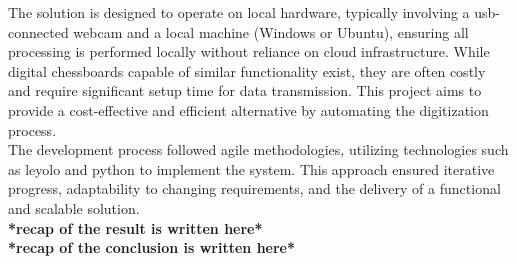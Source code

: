 The solution is designed to operate on local hardware, typically involving a \acrshort{usb}-connected webcam and a local machine (Windows or Ubuntu), ensuring all processing is performed locally without reliance on cloud infrastructure. While digital chessboards capable of similar functionality exist, they are often costly and require significant setup time for data transmission. This project aims to provide a cost-effective and efficient alternative by automating the digitization process.\\

The development process followed \gls{agile} methodologies, utilizing technologies such as \acrshort{leyolo} and \gls{python} to implement the system. This approach ensured iterative progress, adaptability to changing requirements, and the delivery of a functional and scalable solution.\\

\textbf{*recap of the result is written here*}\\

\textbf{*recap of the conclusion is written here*}